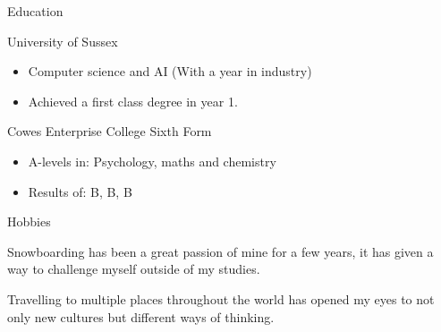 \documentclass[]{article}
\newlength{\tabin}
\newlength{\secsep}
\newcommand{\lineunder}{\vspace*{-8pt} \\ \hspace*{-6pt} \hrulefill \\ \vspace*{-15pt}}
\newenvironment{tabbedsection}[1]{
  \begin{list}{}{
      \setlength{\itemsep}{0pt}
      \setlength{\labelsep}{0pt}
      \setlength{\labelwidth}{0pt}
      \setlength{\leftmargin}{\tabin}
      \setlength{\rightmargin}{\tabin}
      \setlength{\listparindent}{0pt}
      \setlength{\parsep}{0pt}
      \setlength{\parskip}{0pt}
      \setlength{\partopsep}{0pt}
      \setlength{\topsep}{#1}
    }
  \item[]
}{\end{list}}
\newenvironment{resume_section}[1]{
  \filbreak
  \vspace{2\secsep}
  \textsc{\large#1}
  \lineunder
  \begin{tabbedsection}{\secsep}
}{\end{tabbedsection}}
\newenvironment{resume_subsection}[2][]{
  \textbf{#2} \hfill {\footnotesize #1} \hspace{2em}
  \begin{tabbedsection}{0.5\secsep}
}{\end{tabbedsection}}
\newenvironment{subitems}{
  \renewcommand{\labelitemi}{-}
  \begin{itemize}
      \setlength{\labelsep}{1em}
}{\end{itemize}}
\begin{document}
\begin{resume_section}{Education}
  \begin{resume_subsection}{University of Sussex}
    \begin{subitems}
      \item Computer science and AI (With a year in industry)
      \item Achieved a first class degree in year 1.
    \end{subitems}
  \end{resume_subsection}
  
  \begin{resume_subsection}{Cowes Enterprise College Sixth Form}
    \begin{subitems}
      \item A-levels in: Psychology, maths and chemistry
      \item Results of: B, B, B
     \end{subitems}
  \end{resume_subsection}
\end{resume_section}

\begin{resume_section}{Hobbies}
  \begin{resume_subsection}
   \item Snowboarding has been a great passion of mine for a few years, it has given a way to challenge myself outside of my studies.
   \item Travelling to multiple places throughout the world has opened my eyes to not only new cultures but different ways of thinking.
  \end{resume_subsection}
\end{resume_section}
\end{document}
